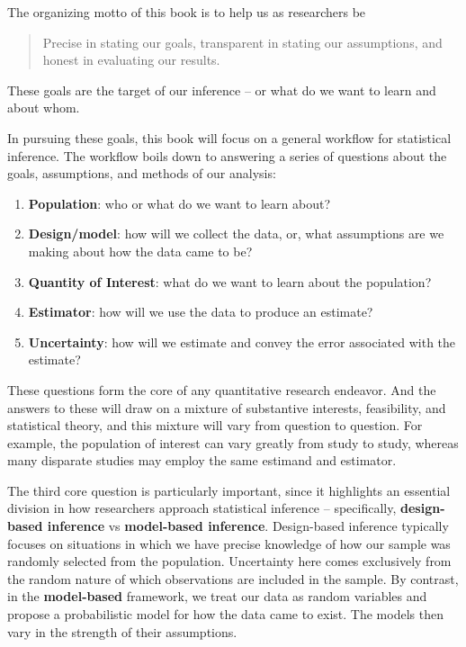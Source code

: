 \documentclass[
  13pt,
  letterpaper,
  DIV=11,
  numbers=noendperiod]{scrreprt}
\providecommand{\tightlist}{%
  \setlength{\itemsep}{0pt}\setlength{\parskip}{0pt}}
\theoremstyle{plain}
\theoremstyle{plain}
\theoremstyle{definition}
\theoremstyle{definition}
\theoremstyle{remark}
\begin{document}
The organizing motto of this book is to help us as researchers be

\begin{quote}
Precise in stating our goals, transparent in stating our assumptions,
and honest in evaluating our results.
\end{quote}

These goals are the target of our inference -- or what do we want to
learn and about whom.

In pursuing these goals, this book will focus on a general workflow for
statistical inference. The workflow boils down to answering a series of
questions about the goals, assumptions, and methods of our analysis:

\begin{enumerate}
\def\labelenumi{\arabic{enumi}.}
\tightlist
\item
  \textbf{Population}: who or what do we want to learn about?
\item
  \textbf{Design/model}: how will we collect the data, or, what
  assumptions are we making about how the data came to be?
\item
  \textbf{Quantity of Interest}: what do we want to learn about the
  population?\\
\item
  \textbf{Estimator}: how will we use the data to produce an estimate?
\item
  \textbf{Uncertainty}: how will we estimate and convey the error
  associated with the estimate?
\end{enumerate}

These questions form the core of any quantitative research endeavor. And
the answers to these will draw on a mixture of substantive interests,
feasibility, and statistical theory, and this mixture will vary from
question to question. For example, the population of interest can vary
greatly from study to study, whereas many disparate studies may employ
the same estimand and estimator.

The third core question is particularly important, since it highlights
an essential division in how researchers approach statistical inference
-- specifically, \textbf{design-based inference} vs \textbf{model-based
inference}. Design-based inference typically focuses on situations in
which we have precise knowledge of how our sample was randomly selected
from the population. Uncertainty here comes exclusively from the random
nature of which observations are included in the sample. By contrast, in
the \textbf{model-based} framework, we treat our data as random
variables and propose a probabilistic model for how the data came to
exist. The models then vary in the strength of their assumptions.
\end{document}

